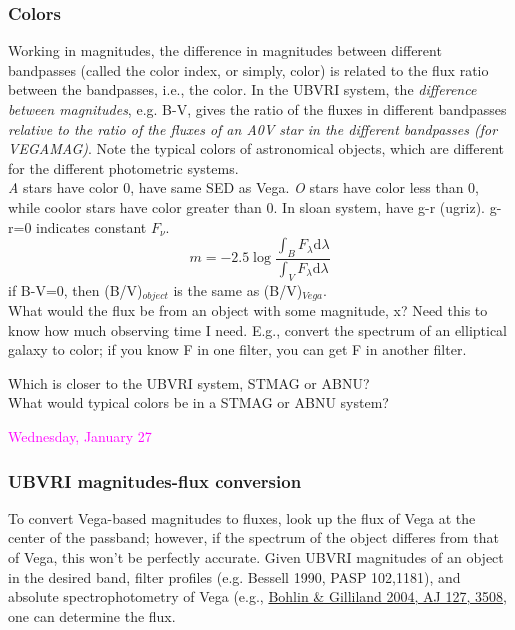 \documentclass[12pt]{article}
\begin{document}
\subsubsection*{Colors}
Working in magnitudes, the difference in magnitudes between different
bandpasses (called the color index, or simply, color) is related to
the flux ratio between the bandpasses, i.e., the color.
In the UBVRI
system, the \emph{difference between magnitudes}, e.g. B-V,
gives the ratio of the fluxes in different bandpasses
\emph{relative to the ratio of the fluxes of
an A0V star in the different bandpasses (for VEGAMAG)}.
Note the typical colors of astronomical objects,
which are different for the different photometric systems.\\
\emph{A} stars have color 0, have same SED as Vega. \emph{O} stars
have color less than 0, while coolor stars have color greater than 0.
In sloan system, have  g-r (ugriz). g-r=0 indicates constant
$F_{\nu}$.
\begin{equation*}
    m = -2.5\log\frac{\int_B F_{\lambda}\textrm{d}\lambda}
    {\int_V F_{\lambda}\textrm{d}\lambda}
\end{equation*}
if B-V=0, then (B/V)$_{object}$ is the same as (B/V)$_{Vega}$.\\

\noindent What would the flux be from an object with some magnitude,
x? Need this to know how much observing time I need. E.g., convert the
spectrum of an elliptical galaxy to color; if you know F in one
filter, you can get F in another filter.

\noindent Which is closer to the UBVRI system, STMAG or ABNU?\\
\noindent What would typical colors be in a STMAG or ABNU system?

\newpage
\noindent \textcolor{magenta}{Wednesday, January 27}\\

\subsubsection*{UBVRI magnitudes-flux conversion}
To convert Vega-based magnitudes to fluxes, look up the flux of Vega
at the center of the passband; however, if the spectrum of the object
differes from that of Vega, this won't be perfectly accurate. Given
UBVRI magnitudes of an object in the desired band, filter profiles
(e.g. Bessell 1990, PASP 102,1181), and absolute spectrophotometry of
Vega (e.g., \href{http://adsabs.harvard.edu/abs/2004AJ....127.3508B}
{Bohlin \& Gilliland 2004, AJ 127, 3508}, one can determine
the flux.\\
\end{document}
